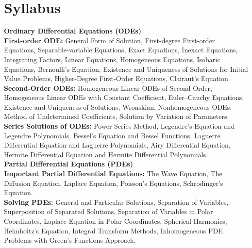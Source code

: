 \documentclass[a4aper,12pt]{report}
\begin{document}
    \chapter*{Syllabus}
    \thispagestyle{empty}
    \vspace*{-2.7cm}
    \textbf{Ordinary Differential Equations (ODEs)} \\ [5pt] 
    \textbf{First-order ODE: }General Form of Solution, First-degree First-order Equations, Separable-variable Equations, Exact Equations, Inexact Equations, Integrating Factors, Linear Equations, Homogeneous Equations, Isobaric Equations, Bernoulli’s Equation, Existence and Uniqueness of Solutions for Initial Value Problems, Higher-Degree First-Order Equations, Clairaut’s Equation. \\ [5pt]
    \textbf{Second-Order ODEs: }Homogeneous Linear ODEs of Second Order, Homogeneous Linear ODEs with Constant Coefficient, Euler–Cauchy Equations, Existence and Uniqueness of Solutions, Wronskian, Nonhomogeneous ODEs, Method of Undetermined Coefficients, Solution by Variation of Parameters. \\ [5pt]
    \textbf{Series Solutions of ODEs: }Power Series Method, Legendre’s Equation and Legendre Polynomials, Bessel’s Equation and Bessel Functions, Laguerre Differential Equation and Laguerre Polynomials, Airy Differential Equation, Hermite Differential Equation and Hermite Differential Polynomials. \\ [8pt]\textbf{Partial Differential Equations (PDEs)} \\ [5pt] 
    \textbf{Important Partial Differential Equations: }The Wave Equation, The Diffusion Equation, Laplace Equation, Poisson’s Equations, Schrodinger’s Equation. \\ [5pt]
    \textbf{Solving PDEs: }General and Particular Solutions, Separation of Variables, Superposition of Separated Solutions, Separation of Variables in Polar Coordinates, Laplace Equation in Polar Coordinates, Spherical Harmonics, Helmholtz’s Equation, Integral Transform Methods, Inhomogeneous PDE Problems with Green’s Functions Approach.
\newpage
\end{document}
